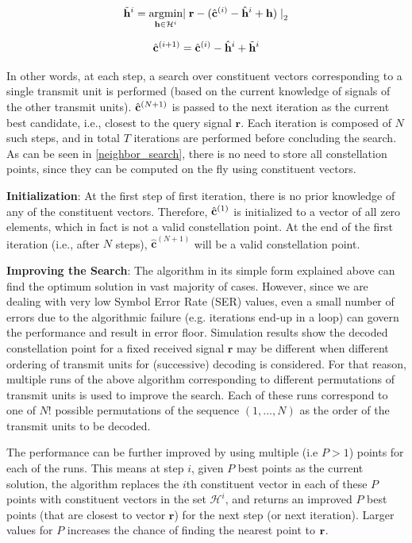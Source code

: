 \begin{equation}
\tilde{\mathbf{h}}^{i} = \underset{\mathbf{h} \in  \mathcal{H}^{i}}{\text{argmin}} {\mid \rv{r} - (\hat{\rv{c} } ^ {(i)} - \hat{\mathbf{h}}^{i}+ \mathbf{h})\mid} _ 2
\label{neighbor_search}
\end{equation}

\begin{equation}
\hat{\mathbf{c} } ^ {(i+1)} = \hat{\mathbf{c} } ^ {(i)}- \hat{\mathbf{h}}^{i}+ \tilde{\mathbf{h}}^{i}
\end{equation}

 In other words, at each step, a search over constituent vectors corresponding to a single transmit unit is performed (based on the current knowledge of signals of the other transmit units). $\hat{\mathbf{c} } ^ {(N+1)}$ is passed to the next iteration as the current best candidate, i.e., closest to the query signal $\mathbf{r}$. Each iteration is composed of $N$ such steps, and in total $T$ iterations are performed before concluding the search. As can be seen in \eqref{neighbor_search}, there is no need to store all constellation points, since they can be computed on the fly using constituent vectors.

\textbf{Initialization}: At the first step of first iteration, there is no prior knowledge of any of the constituent vectors. Therefore, $\hat{\mathbf{c} } ^ {(1)}$ is initialized to a vector of all zero elements, which in fact is not a valid constellation point. At the end of the first iteration (i.e., after $N$ steps), $\hat{\mathbf{c}}^ {(N+1)}$ will be a valid constellation point.

\textbf{Improving the Search}: The algorithm in its simple form explained above can find the optimum solution in vast majority of cases. However, since we are dealing with very low Symbol Error Rate (SER) values, even a small number of errors due to the algorithmic failure (e.g. iterations end-up in a loop) can govern the performance and result in error floor. Simulation results show the decoded constellation point for a fixed received signal $\mathbf{r}$ may be different when different ordering of transmit units for (successive) decoding is considered. For that reason, multiple runs of the above algorithm corresponding to different permutations of transmit units is used to improve the search. Each of these runs correspond to one of $N!$ possible permutations of the sequence $(1, ..., N)$ as the order of the transmit units to be decoded.

The performance can be further improved by using multiple (i.e $P>1$) points for each of the runs. This means at step $i$, given $P$ best points as the current solution,  the algorithm replaces the $i$th constituent vector in each of these $P$ points with  constituent vectors in the set $\mathcal{H}^{i}$, and returns an improved $P$ best points (that are closest to vector $\mathbf{r}$) for the next step (or next iteration). Larger values for $P$ increases the chance of finding the nearest point to $\mathbf{r}$. 

